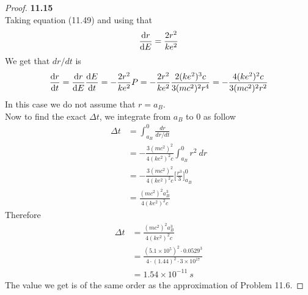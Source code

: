 \documentclass[11pt]{article}
\newcommand{\sci}[1]{\times 10^{#1}}
\theoremstyle{definition}
\begin{document}
\cleardoublepage
\begin{proof}{\textbf{11.15}}\\
Taking equation (11.49) and using that
\begin{align*}
    \dv{r}{E} = \frac{2r^2}{ke^2}
\end{align*}
We get that $dr/dt$ is
\begin{align*}
    \dv{r}{t} = \dv{r}{E}\dv{E}{t}
    = -\frac{2r^2}{ke^2}P
    = -\frac{2r^2}{ke^2}\frac{2(ke^2)^3c}{3(mc^2)^2r^4}
    =-\frac{4(ke^2)^2c}{3(mc^2)^2r^2}
\end{align*}
In this case we do not assume that $r = a_B$.\\
Now to find the exact $\Delta t$, we integrate from $a_B$ to $0$ as follow
\begin{align*}
    \Delta t &= \int_{a_B}^0 \frac{dr}{dr/dt} \\
    &= -\frac{3(mc^2)^2}{4(ke^2)^2c} \int_{a_B}^0 r^2~dr \\
    &= -\frac{3(mc^2)^2}{4(ke^2)^2c} \bigg[\frac{r^3}{3}\bigg]_{a_B}^0\\
    &= \frac{(mc^2)^2a_B^3}{4(ke^2)^2c}
\end{align*}
Therefore
\begin{align*}
    \Delta t
    &= \frac{(mc^2)^2a_B^3}{4(ke^2)^2c} \\
    &= \frac{(5.1\sci{5})^2\cdot 0.0529^3}{4\cdot(1.44)^2\cdot 3\sci{17}} \\
    &= 1.54\sci{-11}~s
\end{align*}
The value we get is of the same order as the approximation of Problem 11.6.
\end{proof}
\end{document}
